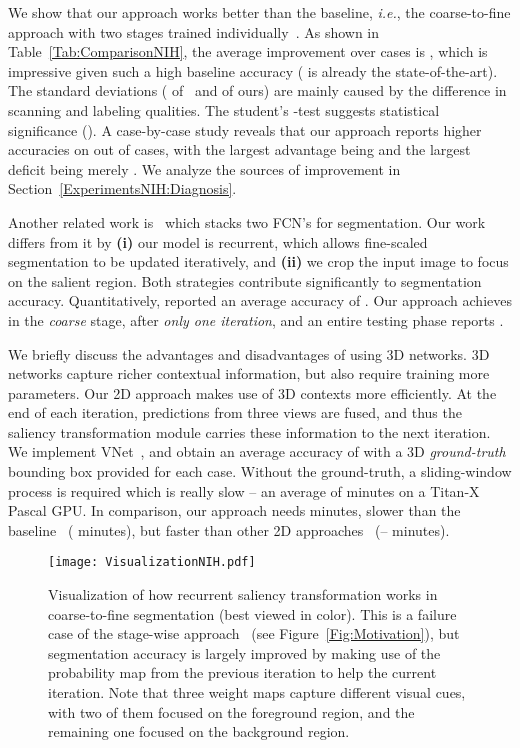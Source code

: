 \documentclass[10pt,twocolumn,letterpaper]{article}
\begin{document}
We show that our approach works better than the baseline,
{\em i.e.}, the coarse-to-fine approach with two stages trained individually~\cite{Zhou_2017_Fixed}.
As shown in Table~\ref{Tab:ComparisonNIH}, the average improvement over  cases is ,
which is impressive given such a high baseline accuracy ( is already the state-of-the-art).
The standard deviations ( of~\cite{Zhou_2017_Fixed} and  of ours)
are mainly caused by the difference in scanning and labeling qualities.
The student's -test suggests statistical significance ().
A case-by-case study reveals that our approach reports higher accuracies on  out of  cases,
with the largest advantage being  and the largest deficit being merely .
We analyze the sources of improvement in Section~\ref{ExperimentsNIH:Diagnosis}.

Another related work is~\cite{Zhang_2016_Coarse} which stacks two FCN's for segmentation.
Our work differs from it by {\bf (i)} our model is recurrent, which allows fine-scaled segmentation to be updated iteratively,
and {\bf (ii)} we crop the input image to focus on the salient region.
Both strategies contribute significantly to segmentation accuracy.
Quantitatively, \cite{Zhang_2016_Coarse} reported an average accuracy of .
Our approach achieves  in the {\em coarse} stage,  after {\em only one iteration},
and an entire testing phase reports .

We briefly discuss the advantages and disadvantages of using 3D networks.
3D networks capture richer contextual information, but also require training more parameters.
Our 2D approach makes use of 3D contexts more efficiently.
At the end of each iteration, predictions from three views are fused,
and thus the saliency transformation module carries these information to the next iteration.
We implement VNet~\cite{Milletari_2016_VNet},
and obtain an average accuracy of  with a 3D {\em ground-truth} bounding box provided for each case.
Without the ground-truth, a sliding-window process is required which is really slow --
an average of  minutes on a Titan-X Pascal GPU.
In comparison, our approach needs  minutes, slower than the baseline~\cite{Zhou_2017_Fixed} ( minutes),
but faster than other 2D approaches~\cite{Roth_2015_DeepOrgan}\cite{Roth_2016_Spatial} (-- minutes).

\renewcommand{\figurewidth}{16.0cm}
\begin{figure*}[t]
\begin{center}
    \texttt{[image: VisualizationNIH.pdf]}
\end{center}
\caption{
    Visualization of how recurrent saliency transformation works in coarse-to-fine segmentation (best viewed in color).
    This is a failure case of the stage-wise approach~\cite{Zhou_2017_Fixed} (see Figure~\ref{Fig:Motivation}),
    but segmentation accuracy is largely improved
    by making use of the probability map from the previous iteration to help the current iteration.
    Note that three weight maps capture different visual cues,
    with two of them focused on the foreground region, and the remaining one focused on the background region.
}
\label{Fig:VisualizationNIH}
\end{figure*}
\end{document}
